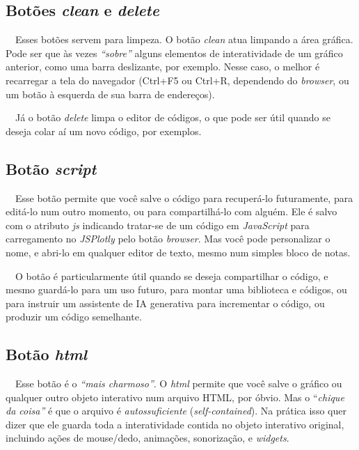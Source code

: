 \documentclass[
  portuguese,
  letterpaper,
  DIV=11,
  numbers=noendperiod]{scrreprt}
\begin{document}
\hfill\break

\subsection{\texorpdfstring{Botões \emph{clean} e
\emph{delete}}{Botões clean e delete}}\label{botuxf5es-clean-e-delete}

~~Esses botões servem para limpeza. O botão \emph{clean} atua limpando a
área gráfica. Pode ser que às vezes \emph{``sobre''} alguns elementos de
interatividade de um gráfico anterior, como uma barra deslizante, por
exemplo. Nesse caso, o melhor é recarregar a tela do navegador (Ctrl+F5
ou Ctrl+R, dependendo do \emph{browser}, ou um botão à esquerda de sua
barra de endereços).

~~Já o botão \emph{delete} limpa o editor de códigos, o que pode ser
útil quando se deseja colar aí um novo código, por exemplos.

\hfill\break

\subsection{\texorpdfstring{Botão
\emph{script}}{Botão script}}\label{botuxe3o-script}

~~Esse botão permite que você salve o código para recuperá-lo
futuramente, para editá-lo num outro momento, ou para compartilhá-lo com
alguém. Ele é salvo com o atributo \emph{js} indicando tratar-se de um
código em \emph{JavaScript} para carregamento no \emph{JSPlotly} pelo
botão \emph{browser}. Mas você pode personalizar o nome, e abri-lo em
qualquer editor de texto, mesmo num simples bloco de notas.

~~O botão é particularmente útil quando se deseja compartilhar o código,
e mesmo guardá-lo para um uso futuro, para montar uma biblioteca e
códigos, ou para instruir um assistente de IA generativa para
incrementar o código, ou produzir um código semelhante.

\hfill\break

\subsection{\texorpdfstring{Botão
\emph{html}}{Botão html}}\label{botuxe3o-html}

~~Esse botão é o \emph{``mais charmoso''}. O \emph{html} permite que
você salve o gráfico ou qualquer outro objeto interativo num arquivo
HTML, por óbvio. Mas o ``\emph{chique da coisa''} é que o arquivo é
\emph{autossuficiente} (\emph{self-contained}). Na prática isso quer
dizer que ele guarda toda a interatividade contida no objeto interativo
original, incluindo ações de mouse/dedo, animações, sonorização, e
\emph{widgets}.
\end{document}
